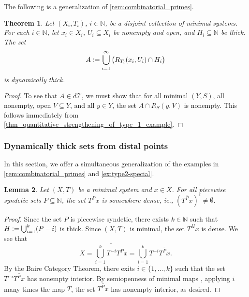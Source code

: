 \documentclass[letter,11pt]{article}
\theoremstyle{plain}
\newtheorem{theorem}{Theorem}
\newtheorem{lemma}[theorem]{Lemma}
\theoremstyle{definition}
\theoremstyle{plain}
\theoremstyle{plain}
\numberwithin{equation}{section}
\newcommand{\N}{\mathbb{N}}
\newcommand{\defeq}{\vcentcolon=}
\newcommand{\dthick}{d\mathcal{T}}
\begin{document}
The following is a generalization of \cref{rem:combinatorial_primes}.

\begin{theorem}%
\label{lemma_more_general_example_of_dy_thick_not_IP}
    Let $(X_i,T_i)$, $i \in \N$, be a disjoint collection of minimal systems.  For each $i \in \N$, let $x_i \in X_i$, $U_i \subseteq X_i$ be nonempty and open, and $H_i \subseteq \N$ be thick.   The set
    \[
        A \defeq \bigcup_{i=1}^\infty \big( R_{T_i}(x_i, U_i) \cap H_i \big)
    \]
    is dynamically thick.
\end{theorem}

\begin{proof}
    To see that $A \in \dthick$, we must show that for all minimal $(Y,S)$, all nonempty, open $V \subseteq Y$, and all $y \in Y$, the set $A \cap R_S(y,V)$ is nonempty.  This follows immediately from \cref{thm_quantitative_strengthening_of_type_1_example}.
\end{proof}

\subsubsection{Dynamically thick sets from distal points}



In this section, we offer a simultaneous generalization of the examples in \cref{rem:combinatorial_primes} and \cref{ex:type2-special}. 


\begin{lemma}
\label{lemma_orbit_along_ps_is_somewhere_dense}
    Let $(X,T)$ be a minimal system and $x \in X$.  For all piecewise syndetic sets $P \subseteq \N$, the set $T^P x$ is somewhere dense, ie., $(\overline{T^P x})^\circ \neq \emptyset$.
\end{lemma}

\begin{proof}
    Since the set $P$ is piecewise syndetic, there exists $k \in \N$ such that $H \defeq \bigcup_{i=1}^k (P-i)$ is thick.  Since $(X,T)$ is minimal, the set $T^H x$ is dense.  We see that
    \[X = \overline{\bigcup_{i=1}^k T^{-i} T^{P}x} = \bigcup_{i=1}^k T^{-i} \overline{T^{P}x}.\]
    By the Baire Category Theorem, there exits $i \in \{1, \ldots, k\}$ such that the set $T^{-i} \overline{T^{P}x}$ has nonempty interior.  By semiopenness of minimal maps \cite[Thm 2.4]{kolyada_snoha_trofimchuk_2001}, applying $i$ many times the map $T$, the set $\overline{T^{P}x}$ has nonempty interior, as desired.
\end{proof}
\end{document}
